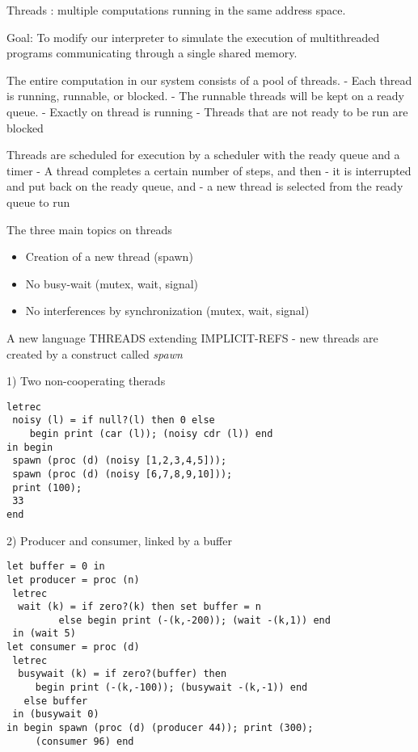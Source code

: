\documentclass{article}
\begin{document}
\begin{huge}
Threads : multiple computations running in the same address space. 

Goal: To modify our interpreter to simulate the execution of multithreaded programs communicating through a single shared memory.

The entire computation in our system consists of a pool of threads. \al
- Each thread is running, runnable, or blocked. \al
- The runnable threads will be kept on a ready queue. \al
- Exactly on thread is running \al
- Threads that are not ready to be run are blocked

Threads are scheduled for execution by a scheduler with the ready queue and a timer \al
- A thread completes a certain number of steps, and then \al
- it is interrupted and put back on the ready queue, and \al
- a new thread is selected from the ready queue to run


The three main topics on threads
\begin{itemize}
\item Creation of a new thread (spawn)
\item No busy-wait (mutex, wait, signal)
\item No interferences by synchronization (mutex, wait, signal)
\end{itemize}



A new language THREADS extending IMPLICIT-REFS \al
- new threads are created by a construct called {\it spawn}

1) Two non-cooperating therads
\begin{lstlisting}
letrec 
 noisy (l) = if null?(l) then 0 else 
    begin print (car (l)); (noisy cdr (l)) end
in begin
 spawn (proc (d) (noisy [1,2,3,4,5]));
 spawn (proc (d) (noisy [6,7,8,9,10]));
 print (100);
 33
end
\end{lstlisting}


2) Producer and consumer, linked by a buffer
\begin{lstlisting}
let buffer = 0 in
let producer = proc (n) 
 letrec
  wait (k) = if zero?(k) then set buffer = n 
         else begin print (-(k,-200)); (wait -(k,1)) end
 in (wait 5)
let consumer = proc (d) 
 letrec
  busywait (k) = if zero?(buffer) then
     begin print (-(k,-100)); (busywait -(k,-1)) end
   else buffer
 in (busywait 0)
in begin spawn (proc (d) (producer 44)); print (300);
     (consumer 96) end
\end{lstlisting}


\end{huge}
\end{document}
